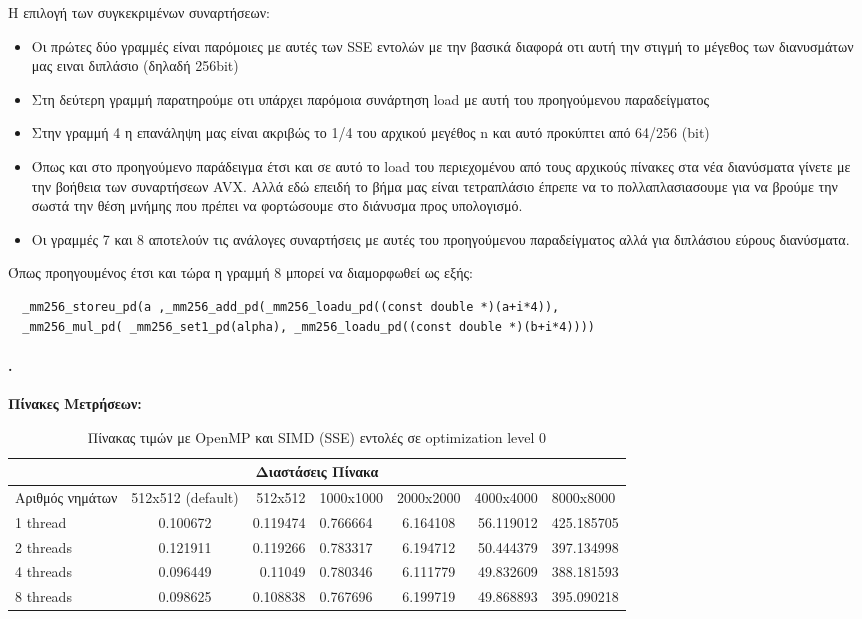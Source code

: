 \documentclass[greek,booktabs,8pt,flagBlueCMYK]{report}
\begin{document}
Η επιλογή των συγκεκριμένων συναρτήσεων:
\begin{itemize}
  \item Οι πρώτες δύο γραμμές είναι παρόμοιες με αυτές των SSE εντολών με την βασικά διαφορά οτι αυτή την στιγμή το μέγεθος των διανυσμάτων μας       ειναι  διπλάσιο (δηλαδή 256bit)
  \item Στη δεύτερη γραμμή παρατηρούμε οτι υπάρχει παρόμοια συνάρτηση load με αυτή του προηγούμενου παραδείγματος
  \item Στην γραμμή 4 η επανάληψη μας είναι ακριβώς το 1/4 του αρχικού μεγέθος n και αυτό προκύπτει από 64/256 (bit) 
  \item Όπως και στο προηγούμενο παράδειγμα έτσι και σε αυτό το load του περιεχομένου από τους αρχικούς πίνακες στα νέα διανύσματα γίνετε με την βοήθεια των συναρτήσεων AVX. Αλλά εδώ επειδή το βήμα μας είναι τετραπλάσιο έπρεπε να το πολλαπλασιασουμε για να βρούμε την σωστά την θέση μνήμης που πρέπει να φορτώσουμε στο διάνυσμα προς υπολογισμό.
  \item Οι γραμμές 7 και 8 αποτελούν τις ανάλογες συναρτήσεις με αυτές του προηγούμενου παραδείγματος αλλά για διπλάσιου εύρους διανύσματα.
\end{itemize}

Όπως προηγουμένος έτσι και τώρα η γραμμή 8 μπορεί να διαμορφωθεί ως εξής:

\begin{lstlisting}
  _mm256_storeu_pd(a ,_mm256_add_pd(_mm256_loadu_pd((const double *)(a+i*4)),   
  _mm256_mul_pd( _mm256_set1_pd(alpha), _mm256_loadu_pd((const double *)(b+i*4))))
\end{lstlisting}

\paragraph{.} \textbf{Πίνακες Μετρήσεων:}\newline
\begin{table}[H]
\begin{center}
\label{tab:8} 
\begin{tabular}{| l | c | r | l | c | r | l |}
  \hline
  \multicolumn{7}{|c|}{Διαστάσεις Πίνακα} \\ \hline
  Αριθμός νημάτων & 512x512 (default) & 512x512 & 1000x1000 & 2000x2000 & 4000x4000 & 8000x8000\\ \hline 
  1 thread   & 0.100672 &   0.119474 &  0.766664   & 6.164108  & 56.119012 &  425.185705 \\ \hline
  2 threads  & 0.121911 &   0.119266  &  0.783317   & 6.194712  & 50.444379 &  397.134998\\ \hline
  4 threads  & 0.096449  &   0.11049  &  0.780346   & 6.111779  & 49.832609 &  388.181593 \\ \hline
  8 threads  & 0.098625 &   0.108838  &  0.767696   & 6.199719  & 49.868893 &  395.090218 \\ \hline
\end{tabular}
\caption {Πίνακας τιμών με OpenMP και SIMD (SSE) εντολές σε optimization level 0}
\end{center}
\end{table}
\end{document}
